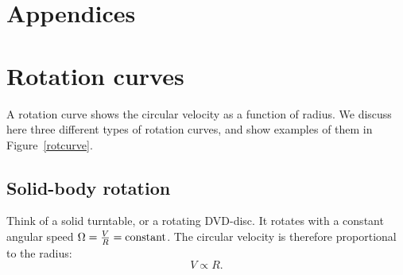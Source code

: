 \chapter*{Appendices}

\appendix

\chapter{Rotation curves}\label{app:rotcurves}
A rotation curve shows the circular velocity as a function of
radius. We discuss here three different types of rotation curves, and
show examples of them in Figure~\ref{rotcurve}.

\section{Solid-body rotation} 
Think of a solid turntable, or a rotating DVD-disc. It rotates with a
constant angular speed $\Omega = \frac{V}{R} = {\rm constant}$. 
The circular velocity is therefore proportional to the radius: 
\begin{equation}
V \propto R. 
\end{equation}

